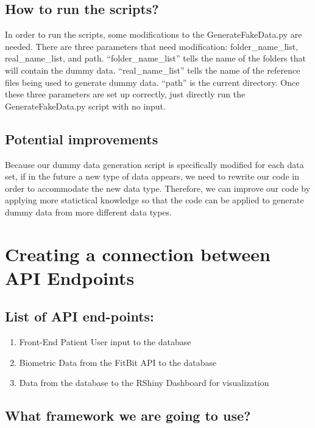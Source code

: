 \documentclass[]{book}
\providecommand{\tightlist}{%
  \setlength{\itemsep}{0pt}\setlength{\parskip}{0pt}}
\begin{document}
\subsection{How to run the scripts?}\label{how-to-run-the-scripts}

In order to run the scripts, some modifications to the
GenerateFakeData.py are needed. There are three parameters that need
modification: folder\_name\_list, real\_name\_list, and path.
``folder\_name\_list'' tells the name of the folders that will contain
the dummy data. ``real\_name\_list'' tells the name of the reference
files being used to generate dummy data. ``path'' is the current
directory. Once these three parameters are set up correctly, just
directly run the GenerateFakeData.py script with no input.

\subsection{Potential improvements}\label{potential-improvements}

Because our dummy data generation script is specifically modified for
each data set, if in the future a new type of data appears, we need to
rewrite our code in order to accommodate the new data type. Therefore,
we can improve our code by applying more statictical knowledge so that
the code can be applied to generate dummy data from more different data
types.

\section{Creating a connection between API
Endpoints}\label{creating-a-connection-between-api-endpoints}

\subsection{List of API end-points:}\label{list-of-api-end-points}

\begin{enumerate}
\def\labelenumi{\arabic{enumi}.}
\tightlist
\item
  Front-End Patient User input to the database
\item
  Biometric Data from the FitBit API to the database
\item
  Data from the database to the RShiny Dashboard for visualization
\end{enumerate}

\subsection{What framework we are going to
use?}\label{what-framework-we-are-going-to-use}
\end{document}
